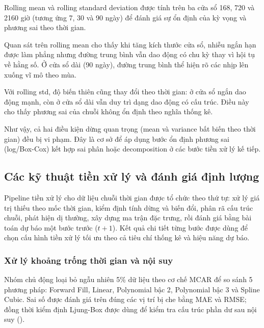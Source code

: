Rolling mean và rolling standard deviation được tính trên ba cửa sổ 168, 720 và 2160 giờ (tương ứng 7, 30 và 90 ngày) để đánh giá sự ổn định của kỳ vọng và phương sai theo thời gian.

Quan sát trên rolling mean cho thấy khi tăng kích thước cửa sổ, nhiễu ngắn hạn được làm phẳng nhưng đường trung bình vẫn dao động có chu kỳ thay vì hội tụ về hằng số. Ở cửa sổ dài (90 ngày), đường trung bình thể hiện rõ các nhịp lên xuống vĩ mô theo mùa.

Với rolling std, độ biến thiên cũng thay đổi theo thời gian: ở cửa sổ ngắn dao động mạnh, còn ở cửa sổ dài vẫn duy trì dạng dao động có cấu trúc. Điều này cho thấy phương sai của chuỗi không ổn định theo nghĩa thống kê.

Như vậy, cả hai điều kiện dừng quan trọng (mean và variance bất biến theo thời gian) đều bị vi phạm. Đây là cơ sở để áp dụng bước ổn định phương sai (log/Box-Cox) kết hợp sai phân hoặc decomposition ở các bước tiền xử lý kế tiếp.

\subsection{Các kỹ thuật tiền xử lý và đánh giá định lượng}
Pipeline tiền xử lý cho dữ liệu chuỗi thời gian được tổ chức theo thứ tự: xử lý giá trị thiếu theo mốc thời gian, kiểm định tính dừng và biến đổi, phân rã cấu trúc chuỗi, phát hiện dị thường, xây dựng ma trận đặc trưng, rồi đánh giá bằng bài toán dự báo một bước trước ($t+1$). Kết quả chi tiết từng bước được dùng để chọn cấu hình tiền xử lý tối ưu theo cả tiêu chí thống kê và hiệu năng dự báo.

\subsubsection{Xử lý khoảng trống thời gian và nội suy}
Nhóm chủ động loại bỏ ngẫu nhiên 5\% dữ liệu theo cơ chế MCAR để so sánh 5 phương pháp: Forward Fill, Linear, Polynomial bậc 2, Polynomial bậc 3 và Spline Cubic. Sai số được đánh giá trên đúng các vị trí bị che bằng MAE và RMSE; đồng thời kiểm định Ljung-Box được dùng để kiểm tra cấu trúc phần dư sau nội suy (\cite{ljung1978measure}).

